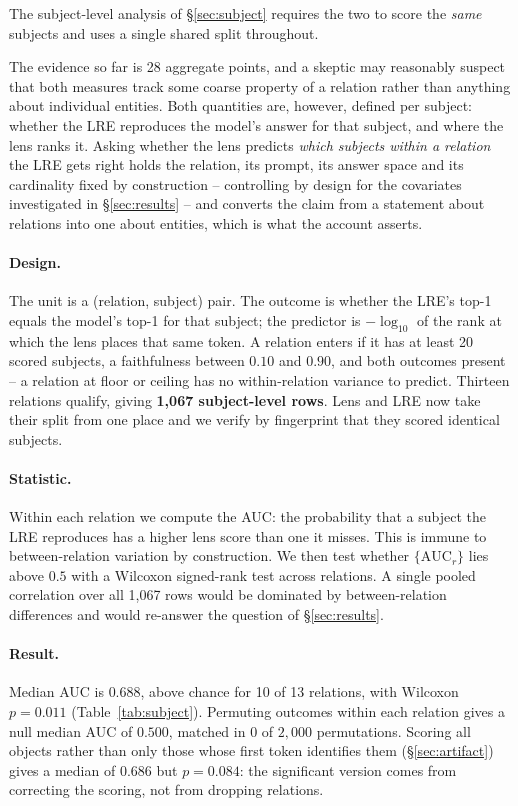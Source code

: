 The subject-level analysis of
\S\ref{sec:subject} requires the two to score the \emph{same} subjects and
uses a single shared split throughout.

The evidence so far is 28 aggregate points, and a skeptic may reasonably
suspect that both measures track some coarse property of a relation rather
than anything about individual entities. Both quantities are, however,
defined per subject: whether the LRE reproduces the model's answer for
that subject, and where the lens ranks it. Asking whether the lens
predicts \emph{which subjects within a relation} the LRE gets right holds
the relation, its prompt, its answer space and its cardinality fixed by
construction -- controlling by design for the covariates
investigated in \S\ref{sec:results}
 -- and converts the claim from a statement about relations
into one about entities, which is what the account asserts.

\paragraph{Design.} The unit is a (relation, subject) pair. The outcome is
whether the LRE's top-1 equals the model's top-1 for that subject; the
predictor is $-\log_{10}$ of the rank at which the lens places that same
token. A relation enters if it has at least 20 scored subjects, a
faithfulness between $0.10$ and $0.90$, and both outcomes present -- a
relation at floor or ceiling has no within-relation variance to predict.
Thirteen relations qualify, giving \textbf{1{,}067 subject-level rows}.
Lens and LRE now take their split from one place and we verify by
fingerprint that they scored identical subjects.

\paragraph{Statistic.} Within each relation we compute the AUC: the
probability that a subject the LRE reproduces has a higher lens score than
one it misses. This is immune to between-relation variation by
construction. We then test whether $\{\mathrm{AUC}_r\}$ lies above $0.5$
with a Wilcoxon signed-rank test across relations. A single pooled
correlation over all 1{,}067 rows would be dominated by between-relation
differences and would re-answer the question of \S\ref{sec:results}.



\paragraph{Result.} Median AUC is $\mathbf{0.688}$, above chance for
10 of 13 relations, with Wilcoxon $p = 0.011$ (Table~\ref{tab:subject}).
Permuting outcomes within each relation gives a null median AUC of
$0.500$, matched in $0$ of $2{,}000$ permutations. Scoring all objects
rather than only those whose first token identifies them
(\S\ref{sec:artifact}) gives a median of $0.686$ but $p = 0.084$: the
significant version comes from correcting the scoring, not from dropping
relations.

